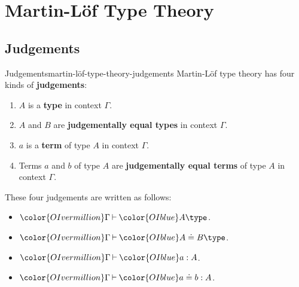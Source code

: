 \section{Martin-Löf Type Theory}\label{section-martin-löf-type-theory}
\subsection{Judgements}\label{subsection-martin-löf-type-theory-judgements}
\begin{definition}{Judgements}{martin-löf-type-theory-judgements}%
    Martin-Löf type theory has four kinds of \textbf{judgements}:
    \begin{enumerate}
        \item\label{martin-löf-type-theory-being-a-type}$A$ is a \textbf{type} in context $\Gamma$.
        \item\label{martin-löf-type-theory-being-judgementally-equal-types}$A$ and $B$ are \textbf{judgementally equal types} in context $\Gamma$.
        \item\label{martin-löf-type-theory-being-a-term}$a$ is a \textbf{term} of type $A$ in context $\Gamma$.
        \item\label{martin-löf-type-theory-being-judgementally-equal-terms}Terms $a$ and $b$ of type $A$ are \textbf{judgementally equal terms} of type $A$ in context $\Gamma$.
    \end{enumerate}
    These four judgements are written as follows:
    \begin{itemize}
        \item ${\color{OIvermillion}\Gamma}\mathbin{\vdash}{\color{OIblue}A\type}$.
        \item ${\color{OIvermillion}\Gamma}\mathbin{\vdash}{\color{OIblue}A\doteq B\type}$.
        \item ${\color{OIvermillion}\Gamma}\mathbin{\vdash}{\color{OIblue}a:A}$.
        \item ${\color{OIvermillion}\Gamma}\mathbin{\vdash}{\color{OIblue}a\doteq b:A}$.
    \end{itemize}
\end{definition}
